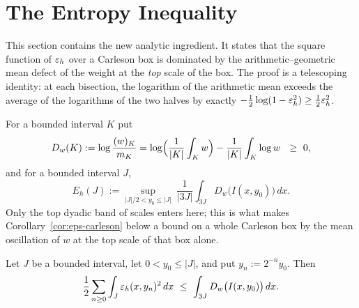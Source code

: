 \section{The Entropy Inequality}\label{sec:entropy}

This section contains the new analytic ingredient. It states that the square
function of $\varepsilon_h$ over a Carleson box is dominated by the
arithmetic--geometric mean defect of the weight at the \emph{top} scale of the
box. The proof is a telescoping identity: at each bisection, the logarithm of
the arithmetic mean exceeds the average of the logarithms of the two halves by
exactly $-\tfrac12\log(1-\varepsilon_h^2)\ge\tfrac12\varepsilon_h^2$.

\begin{definition}\label{def:D}
	\leanok
	For a bounded interval $K$ put
	\[
	D_w(K):=\log\frac{(w)_K}{m_K}
	=\log\Bigl(\frac1{|K|}\int_Kw\Bigr)-\frac1{|K|}\int_K\log w\ \ \ge\ 0 ,
	\]
	and for a bounded interval $J$,
	\[
	E_h(J):=\sup_{|J|/2<y_0\le|J|}\ \frac1{|3J|}\int_{3J}D_w\bigl(I(x,y_0)\bigr)\,dx .
	\]
	Only the top dyadic band of scales enters here; this is what makes
	Corollary~\ref{cor:eps-carleson} below a bound on a whole Carleson box by the
	mean oscillation of $w$ at the top scale of that box alone.
\end{definition}

\begin{lemma}\label{lem:entropy}
	\leanok
	Let $J$ be a bounded interval, let $0<y_0\le|J|$, and put $y_n:=2^{-n}y_0$.
	Then
	\[
	\frac12\sum_{n\ge0}\int_J\varepsilon_h(x,y_n)^2\,dx
	\ \le\ \int_{3J}D_w\bigl(I(x,y_0)\bigr)\,dx .
	\]
\end{lemma}

